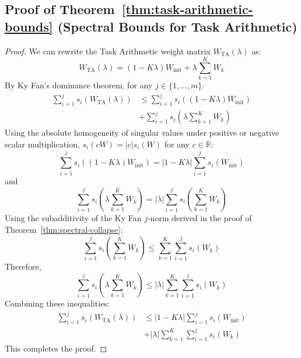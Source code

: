 \documentclass{article}
\theoremstyle{plain}
\theoremstyle{definition}
\theoremstyle{remark}
\begin{document}
\subsection{Proof of Theorem~\ref{thm:task-arithmetic-bounds} (Spectral Bounds for Task Arithmetic)}
\label{appendix:task-arithmetic-bounds-proof}
\begin{proof}
We can rewrite the Task Arithmetic weight matrix $W_{\text{TA}}(\lambda)$ as:
\begin{equation}
    W_{\text{TA}}(\lambda) = (1 - K\lambda) W_{\text{init}} + \lambda \sum_{k=1}^K W_k
\end{equation}
By Ky Fan's dominance theorem, for any $j \in \{1, \dots, m\}$:
\begin{equation}
\begin{split}
    \sum_{i=1}^j s_i(W_{\text{TA}}(\lambda)) &\le \sum_{i=1}^j s_i\left( (1 - K\lambda) W_{\text{init}} \right) \\
    &+ \sum_{i=1}^j s_i\left( \lambda \sum_{k=1}^K W_k \right)
\end{split}
\end{equation}
Using the absolute homogeneity of singular values under positive or negative scalar multiplication, $s_i(c W) = |c| s_i(W)$ for any $c \in \mathbb{R}$:
\begin{equation}
    \sum_{i=1}^j s_i\left( (1 - K\lambda) W_{\text{init}} \right) = |1 - K\lambda| \sum_{i=1}^j s_i(W_{\text{init}})
\end{equation}
and
\begin{equation}
    \sum_{i=1}^j s_i\left( \lambda \sum_{k=1}^K W_k \right) = |\lambda| \sum_{i=1}^j s_i\left( \sum_{k=1}^K W_k \right)
\end{equation}
Using the subadditivity of the Ky Fan $j$-norm derived in the proof of Theorem~\ref{thm:spectral-collapse}:
\begin{equation}
    \sum_{i=1}^j s_i\left( \sum_{k=1}^K W_k \right) \le \sum_{k=1}^K \sum_{i=1}^j s_i(W_k)
\end{equation}
Therefore,
\begin{equation}
    \sum_{i=1}^j s_i\left( \lambda \sum_{k=1}^K W_k \right) \le |\lambda| \sum_{k=1}^K \sum_{i=1}^j s_i(W_k)
\end{equation}
Combining these inequalities:
\begin{equation}
\begin{split}
    \sum_{i=1}^j s_i(W_{\text{TA}}(\lambda)) &\le |1 - K\lambda| \sum_{i=1}^j s_i(W_{\text{init}}) \\
    &+ |\lambda| \sum_{k=1}^K \sum_{i=1}^j s_i(W_k)
\end{split}
\end{equation}
This completes the proof.
\end{proof}
\end{document}
